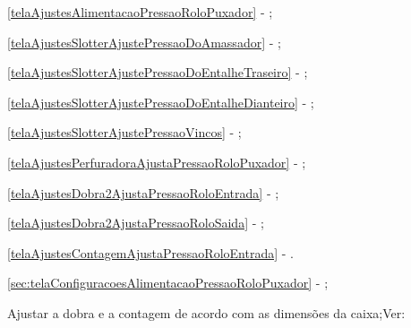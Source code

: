 \begin{procedureAdjustmentNoRecipe}
\begin{pressureAdjustment}
      \item[\ding{\dingNumber}] \ref{telaAjustesAlimentacaoPressaoRoloPuxador} - ;
      \item[\ding{\dingNumber}] \ref{telaAjustesSlotterAjustePressaoDoAmassador} - ;
      \item[\ding{\dingNumber}] \ref{telaAjustesSlotterAjustePressaoDoEntalheTraseiro} - ;
      \item[\ding{\dingNumber}] \ref{telaAjustesSlotterAjustePressaoDoEntalheDianteiro} - ;
      \item[\ding{\dingNumber}] \ref{telaAjustesSlotterAjustePressaoVincos} - ;
      \item[\ding{\dingNumber}] \ref{telaAjustesPerfuradoraAjustaPressaoRoloPuxador} - ;
      \item[\ding{\dingNumber}] \ref{telaAjustesDobra2AjustaPressaoRoloEntrada} - ;
      \item[\ding{\dingNumber}] \ref{telaAjustesDobra2AjustaPressaoRoloSaida} - ;
      \item[\ding{\dingNumber}] \ref{telaAjustesContagemAjustaPressaoRoloEntrada} - .
      
      \newpage
      \thispagestyle{fancy}
      \vspace*{50 pt}

      \fi
      \ifmachineTypeIcv

      \item[\ding{\dingNumber}] \ref{sec:telaConfiguracoesAlimentacaoPressaoRoloPuxador} - ;

      \fi
    \end{pressureAdjustment}

    
  
  \ifmachineTypeFlexo
  \item[\ding{\dingNumber}] Ajustar a dobra e a contagem de acordo com as dimensões da caixa;Ver: 
  \begin{foldCount}
    


\end{foldCount}
\end{procedureAdjustmentNoRecipe}
